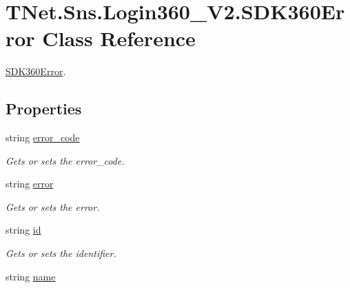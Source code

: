 \hypertarget{class_t_net_1_1_sns_1_1_login360___v2_1_1_s_d_k360_error}{}\section{T\+Net.\+Sns.\+Login360\+\_\+\+V2.\+S\+D\+K360\+Error Class Reference}
\label{class_t_net_1_1_sns_1_1_login360___v2_1_1_s_d_k360_error}


\mbox{\hyperlink{class_t_net_1_1_sns_1_1_login360___v2_1_1_s_d_k360_error}{S\+D\+K360\+Error}}.  


\subsection*{Properties}
\begin{DoxyCompactItemize}
\item 
string \mbox{\hyperlink{class_t_net_1_1_sns_1_1_login360___v2_1_1_s_d_k360_error_a62739bc47c89d63385c490aaa9ce0553}{error\+\_\+code}}
\begin{DoxyCompactList}\small\item\em Gets or sets the error\+\_\+code. \end{DoxyCompactList}\item 
string \mbox{\hyperlink{class_t_net_1_1_sns_1_1_login360___v2_1_1_s_d_k360_error_a25dc278a5a587156cb6cf46ae2ed44a4}{error}}
\begin{DoxyCompactList}\small\item\em Gets or sets the error. \end{DoxyCompactList}\item 
string \mbox{\hyperlink{class_t_net_1_1_sns_1_1_login360___v2_1_1_s_d_k360_error_ae762d41b438e36015b3dcb218e834cc0}{id}}
\begin{DoxyCompactList}\small\item\em Gets or sets the identifier. \end{DoxyCompactList}\item 
string \mbox{\hyperlink{class_t_net_1_1_sns_1_1_login360___v2_1_1_s_d_k360_error_a8cc6c4fc1549fb60075d0438690c96bc}{name}}

\end{DoxyCompactItemize}
